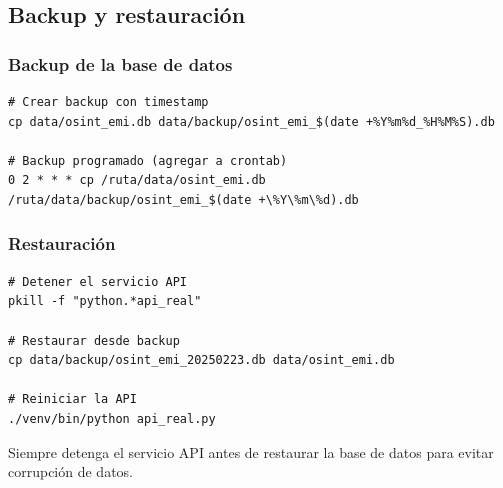 \documentclass[12pt,a4paper]{article}
\begin{document}
\subsection{Backup y restauración}

\subsubsection{Backup de la base de datos}
\begin{verbatim}
# Crear backup con timestamp
cp data/osint_emi.db data/backup/osint_emi_$(date +%Y%m%d_%H%M%S).db

# Backup programado (agregar a crontab)
0 2 * * * cp /ruta/data/osint_emi.db /ruta/data/backup/osint_emi_$(date +\%Y\%m\%d).db
\end{verbatim}

\subsubsection{Restauración}
\begin{verbatim}
# Detener el servicio API
pkill -f "python.*api_real"

# Restaurar desde backup
cp data/backup/osint_emi_20250223.db data/osint_emi.db

# Reiniciar la API
./venv/bin/python api_real.py
\end{verbatim}

\begin{warningbox}
Siempre detenga el servicio API antes de restaurar la base de datos para evitar corrupción de datos.
\end{warningbox}
\end{document}
